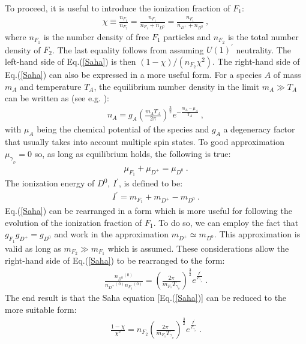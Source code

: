 \documentclass[12pt]{article}
\begin{document}
To proceed, it is useful to introduce the ionization fraction of $F _1$:
%
\begin{eqnarray}
\chi \equiv \frac{n _{F_1}}{n _{F_2}} = \frac{n _{F_1}}{n _{F_1} + n _{D ^0}} = \frac{n _{F_1}}{n _{D ^+} + n _{D ^0}} \ ,
\end{eqnarray}
%
where $n _{F_1}$ is the number density of free $F_1$ particles and $n _{F_2}$ is the total number density of $F_2$. The last equality follows from assuming $U(1) ^{'}$ neutrality. The left-hand side of Eq.(\ref{Saha}) is then $(1-\chi)/(n _{F_2}\chi ^2)$. The right-hand side of Eq.(\ref{Saha}) can also be expressed in a more useful form. For a species $A$ of mass $m _A$ and temperature $T _A$, the equilibrium number density in the limit $m _A \gg T _A$ can be written as (see e.g. \cite{dodelson}):
%
\begin{eqnarray}
n _A = g _A \left ( \frac{m _A T _A}{2\pi} \right ) ^{\frac{3}{2}} e ^{-\frac{m _A - \mu _A}{T _A}} \ ,
\end{eqnarray}
%
with $\mu _A$ being the chemical potential of the species and $g _A$ a degeneracy factor that usually takes into account multiple spin states. To good approximation $\mu _{\gamma _{_D}} = 0$ so, as long as equilibrium holds, the following is true:
%
\begin{eqnarray}
\mu _{F_1} + \mu _{D ^+} = \mu _{D ^0} \ .
\end{eqnarray}
%
The ionization energy of $D ^0$, $I ^{'}$, is defined to be:
%
\begin{eqnarray}
I ^{'} = m _{F_1} + m _{D ^+} - m _{D ^0} \ .
\end{eqnarray}
%
Eq.(\ref{Saha}) can be rearranged in a form which is more useful for following the evolution of the ionization fraction of $F _1$. To do so, we can employ the fact that $g _{F_1}g _{D ^+} = g _{D ^0}$ and work in the approximation $m _{D ^+} \simeq m _{D ^0}$. This approximation is valid as long as $m _{F_2} \gg m _{F_1}$ which is assumed. These considerations allow the right-hand side of Eq.(\ref{Saha}) to be rearranged to the form:
%
\begin{eqnarray}
\frac{{n _{D ^0}}^{(0)}}{{n_{D ^+}}^{(0)}{n _{F_1}}^{(0)}} = \left ( \frac{2\pi}{m _{F_1}T _{\gamma _{_D}}} \right ) ^{\frac{3}{2}} e ^{\frac{I ^{'}}{T _{\gamma _{_D}}}} \ .
\label{Saha1}
\end{eqnarray}
%
The end result is that the Saha equation [Eq.(\ref{Saha})] can be reduced to the more suitable form:
%
\begin{eqnarray}
\frac{1 - \chi}{\chi ^2} = n _{F_2}\left ( \frac{2\pi}{m _{F_1}T _{\gamma _{_D}}} \right ) ^{\frac{3}{2}} e ^{\frac{I ^{'}}{T _{\gamma _{_D}}}} \ .
\label{Saha2}
\end{eqnarray}
\end{document}
